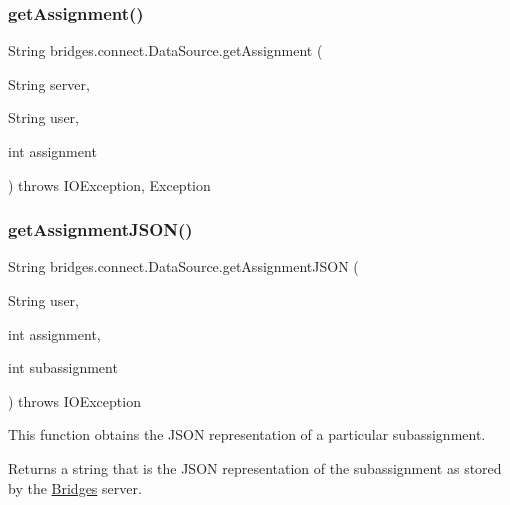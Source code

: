 \mbox{\label{classbridges_1_1connect_1_1_data_source_afdd8d0df6dc8d5a5d40b56c3b62c9d86}} 
\subsubsection{\texorpdfstring{get\+Assignment()}{getAssignment()}\hspace{0.1cm}{\footnotesize\ttfamily [2/2]}}
{\footnotesize\ttfamily String bridges.\+connect.\+Data\+Source.\+get\+Assignment (\begin{DoxyParamCaption}\item[{String}]{server,  }\item[{String}]{user,  }\item[{int}]{assignment }\end{DoxyParamCaption}) throws I\+O\+Exception, Exception}

\mbox{\label{classbridges_1_1connect_1_1_data_source_af2f6cd7172acb64b2ba49f134b5391f8}} 
\subsubsection{\texorpdfstring{get\+Assignment\+J\+S\+O\+N()}{getAssignmentJSON()}\hspace{0.1cm}{\footnotesize\ttfamily [1/2]}}
{\footnotesize\ttfamily String bridges.\+connect.\+Data\+Source.\+get\+Assignment\+J\+S\+ON (\begin{DoxyParamCaption}\item[{String}]{user,  }\item[{int}]{assignment,  }\item[{int}]{subassignment }\end{DoxyParamCaption}) throws I\+O\+Exception}

This function obtains the J\+S\+ON representation of a particular subassignment.

\begin{DoxyReturn}{Returns}
a string that is the J\+S\+ON representation of the subassignment as stored by the \hyperlink{classbridges_1_1connect_1_1_bridges}{Bridges} server. 
\end{DoxyReturn}

